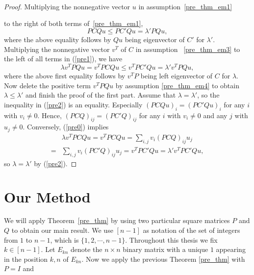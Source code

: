 \documentclass[12pt, a4paper]{article}
\theoremstyle{plain}
\theoremstyle{definition}
\begin{document}
\begin{proof}
    Multiplying the nonnegative vector $u$ in assumption~\ref{pre_thm_em1}
    
    to the right of both terms of~\ref{pre_thm_em1},
    \begin{equation}\label{pre1}
       PCQu\leq PC'Qu=\lambda'PQu,
    \end{equation}
 where the above equality follows by $Qu$ being eigenvector of $C'$ for $\lambda'$.
    Multiplying the nonnegative vector $v^T$ of $C$ in assumption
     ~\ref{pre_thm_em3} to the left of all terms  in (\ref{pre1}), we have
    \begin{equation}\label{pre2}
        \lambda v^TPQu=v^TPCQu\leq v^TPC'Qu=\lambda' v^TPQu,
    \end{equation}
    where the above first equality follows by $v^TP$ being
    left eigenvector of $C$ for $\lambda$.
    Now delete the positive term $v^TPQu$ by assumption \ref{pre_thm_em4} to obtain
        $\lambda\leq \lambda'$ and finish the proof of the first part.
        Assume that $\lambda=\lambda'$, so the inequality in (\ref{pre2}) is an equality.
        Especially $(PCQu)_i=(PC'Qu)_i$ for any $i$ with $v_i\not=0.$ Hence,
        $(PCQ)_{ij}=(PC'Q)_{ij}$ for any $i$ with $v_i\not=0$ and any $j$ with
        $u_j\not=0.$ Conversely, (\ref{pre0}) implies
        \begin{align*} &\lambda v^TPCQu=v^TPCQu=\sum_{i,j} v_i(PCQ)_{ij}u_j\\ =&
         \sum_{i,j} v_i(PC'Q)_{ij}u_j=v^TPC'Qu=\lambda'v^TPC'Qu,
         \end{align*} so $\lambda=\lambda'$ by (\ref{pre2}).
\end{proof}

\section{Our Method}

We will apply Theorem~\ref{pre_thm} by using two particular square matrices $P$ and $Q$ to obtain our main result. 
We use $[n-1]$ as notation of the set of integers from $1$ to $n-1$, which is $\{1,2,\cdots,n-1\}$.
Throughout this thesis we fix $k\in [n-1]$. Let $E_{kn}$ denote the $n\times n$ binary matrix with a unique $1$
appearing in the position $k,n$ of $E_{kn}$. Now we apply the previous Theorem \ref{pre_thm} with $P=I$ and
\end{document}
